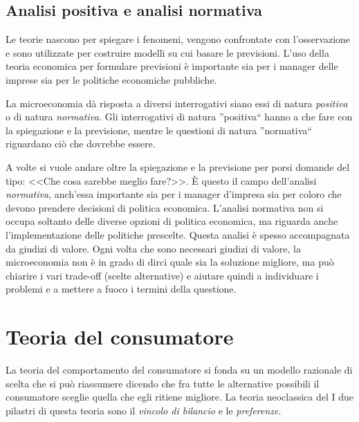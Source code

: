 \subsection{Analisi positiva e analisi normativa}

Le teorie nascono per spiegare i fenomeni, vengono confrontate con 
l'osservazione e sono utilizzate per costruire modelli su cui basare le 
previsioni. L'uso della teoria economica per formulare previsioni è importante 
sia per i manager delle imprese sia per le politiche economiche pubbliche. 

La microeconomia dà risposta a diversi interrogativi siano essi di natura 
\emph{positiva} o di natura \emph{normativa}. Gli interrogativi di natura 
''positiva`` hanno a che fare con la spiegazione e la previsione, mentre le 
questioni di natura ''normativa`` riguardano ciò che dovrebbe essere.

A volte si vuole andare oltre la spiegazione e la previsione per porsi domande 
del tipo: <<Che cosa sarebbe meglio fare?>>. 
È questo il campo dell'analisi \emph{normativa}, anch'essa importante sia per i 
manager d'impresa sia per coloro che devono prendere decisioni di politica 
economica. 
L'analisi normativa non si occupa soltanto delle diverse opzioni di politica 
economica, ma riguarda anche l'implementazione delle politiche prescelte. Questa 
analisi è spesso accompagnata da giudizi di valore. Ogni volta che sono 
necessari giudizi di valore, la microeconomia non è in grado di dirci quale sia 
la soluzione migliore, ma può chiarire i vari trade-off (scelte alternative) e 
aiutare quindi a individuare i problemi e a mettere a fuoco i termini della 
questione.

\section{Teoria del consumatore}
\label{sec:modelli_teoria_consumatore}



La teoria del comportamento del consumatore si fonda su un modello razionale di 
scelta che si può riassumere dicendo che fra tutte le alternative possibili il 
consumatore sceglie quella che egli ritiene migliore. 
La teoria neoclassica del 
I due pilastri di questa teoria sono il \emph{vincolo di bilancio} e le 
\emph{preferenze}.

